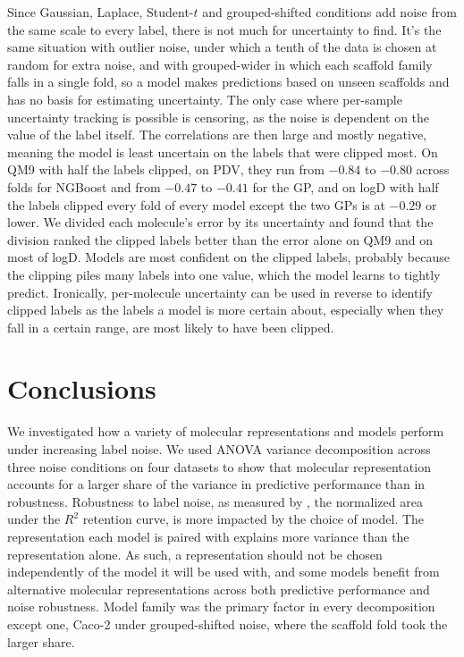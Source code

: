Since Gaussian, Laplace, Student-$t$ and grouped-shifted conditions add noise from the same scale to every label, there is not much for uncertainty to find. It's the same situation with outlier noise, under which a tenth of the data is chosen at random for extra noise, and with grouped-wider in which each scaffold family falls in a single fold, so a model makes predictions based on unseen scaffolds and has no basis for estimating uncertainty. The only case where per-sample uncertainty tracking is possible is censoring, as the noise is dependent on the value of the label itself. The correlations are then large and mostly negative, meaning the model is least uncertain on the labels that were clipped most. On QM9 with half the labels clipped, on PDV, they run from $-0.84$ to $-0.80$ across folds for NGBoost and from $-0.47$ to $-0.41$ for the GP, and on logD with half the labels clipped every fold of every model except the two GPs is at $-0.29$ or lower. We divided each molecule's error by its uncertainty and found that the division ranked the clipped labels better than the error alone on QM9 and on most of logD. Models are most confident on the clipped labels, probably because the clipping piles many labels into one value, which the model learns to tightly predict. Ironically, per-molecule uncertainty can be used in reverse to identify clipped labels as the labels a model is more certain about, especially when they fall in a certain range, are most likely to have been clipped.

\section{Conclusions}

We investigated how a variety of molecular representations and models perform under increasing label noise. We used ANOVA variance decomposition across three noise conditions on four datasets to show that molecular representation accounts for a larger share of the variance in predictive performance than in robustness. Robustness to label noise, as measured by \aucnorm, the normalized area under the $R^2$ retention curve, is more impacted by the choice of model. The representation each  model is paired with explains more variance than the representation alone. As such, a representation should not be chosen independently of the model it will be used with, and some models benefit from alternative molecular representations across both predictive performance and noise robustness. Model family was the primary factor in every decomposition except one,  Caco-2 under grouped-shifted noise, where the scaffold fold took the larger share.

